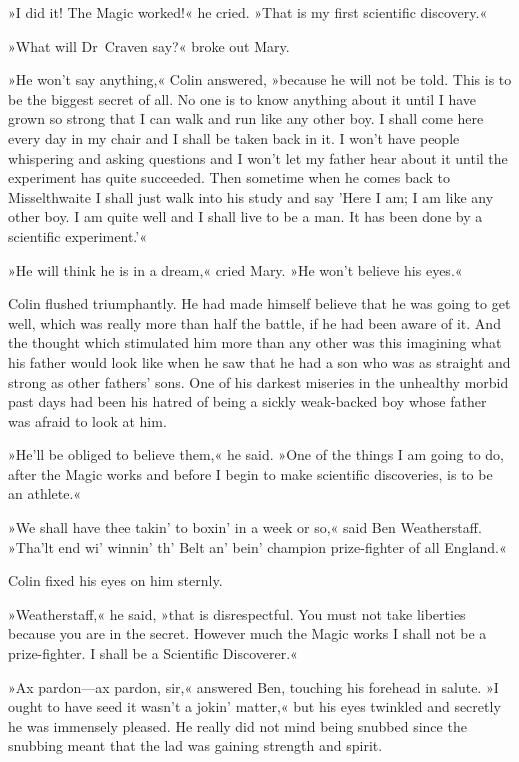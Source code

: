 »I did it! The Magic worked!« he cried. »That is my first scientific discovery.«

»What will Dr~Craven say?« broke out Mary.

»He won't say anything,« Colin answered, »because he will not be told. This is to be the biggest secret of all. No one is to know anything about it until I have grown so strong that I can walk and run like any other boy. I shall come here every day in my chair and I shall be taken back in it. I won't have people whispering and asking questions and I won't let my father hear about it until the experiment has quite succeeded. Then sometime when he comes back to Misselthwaite I shall just walk into his study and say 'Here I am; I am like any other boy. I am quite well and I shall live to be a man. It has been done by a scientific experiment.'«

»He will think he is in a dream,« cried Mary. »He won't believe his eyes.«

Colin flushed triumphantly. He had made himself believe that he was going to get well, which was really more than half the battle, if he had been aware of it. And the thought which stimulated him more than any other was this imagining what his father would look like when he saw that he had a son who was as straight and strong as other fathers' sons. One of his darkest miseries in the unhealthy morbid past days had been his hatred of being a sickly weak-backed boy whose father was afraid to look at him.

»He'll be obliged to believe them,« he said. »One of the things I am going to do, after the Magic works and before I begin to make scientific discoveries, is to be an athlete.«

»We shall have thee takin' to boxin' in a week or so,« said Ben Weatherstaff. »Tha'lt end wi' winnin' th' Belt an' bein' champion prize-fighter of all England.«

Colin fixed his eyes on him sternly.

»Weatherstaff,« he said, »that is disrespectful. You must not take liberties because you are in the secret. However much the Magic works I shall not be a prize-fighter. I shall be a Scientific Discoverer.«

»Ax pardon—ax pardon, sir,« answered Ben, touching his forehead in salute. »I ought to have seed it wasn't a jokin' matter,« but his eyes twinkled and secretly he was immensely pleased. He really did not mind being snubbed since the snubbing meant that the lad was gaining strength and spirit.